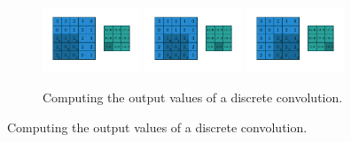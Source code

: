 \begin{figure}
\begin{subfigure}[b]{0.6\textwidth}
        \includegraphics[width=0.32\textwidth]{chapters/assets/2d-conv-example/numerical_no_padding_no_strides_06.pdf}
        \includegraphics[width=0.32\textwidth]{chapters/assets/2d-conv-example/numerical_no_padding_no_strides_07.pdf}
        \includegraphics[width=0.32\textwidth]{chapters/assets/2d-conv-example/numerical_no_padding_no_strides_08.pdf}
        \caption{\label{fig:numerical_no_padding_no_strides} Computing the output
            values of a discrete convolution.}
     \end{subfigure}
     

\end{figure}
